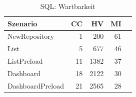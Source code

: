 \begin{table}[ht]
\centering
\caption{SQL: Wartbarkeit}
\begin{tabular}{lrrrr}
\toprule
Szenario & CC & HV & MI \\
\midrule
	NewRepository & 1 & 200 & 61 \\
	List & 5 & 677 & 46 \\
	ListPreload & 11 & 1382 & 37 \\
	Dashboard & 18 & 2122 & 30 \\
	DashboardPreload & 21 & 2565 & 28 \\
\bottomrule
\end{tabular}
\label{tab:sql_maintainability}
\end{table}
	